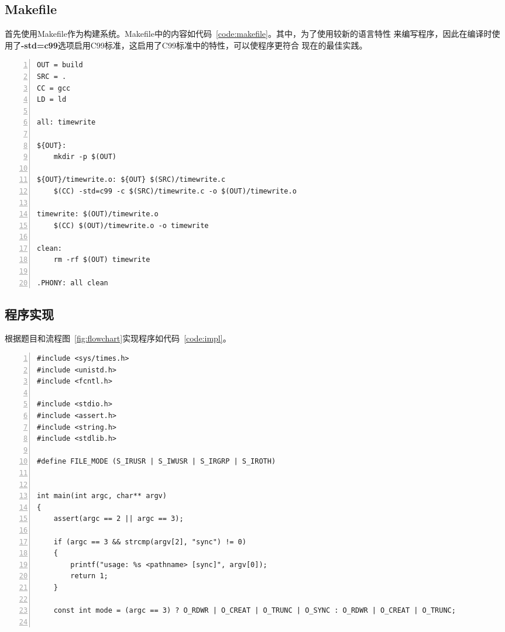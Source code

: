 \documentclass[a4paper,twoside]{article}
\begin{document}
\begin{spacing}{1.2}
\begin{figure}[htbp]
\begin{tikzpicture}[node distance=1cm]
	\end{tikzpicture}
\end{figure}

\subsection{Makefile}

首先使用Makefile作为构建系统。Makefile中的内容如代码~\ref{code:makefile}。其中，为了使用较新的语言特性
来编写程序，因此在编译时使用了\textbf{-std=c99}选项启用C99标准，这启用了C99标准中的特性，可以使程序更符合
现在的最佳实践。

\begin{lstlisting}[numbers=left,style=MakefileStyle,caption=Makefile,label={code:makefile}]
OUT = build
SRC = .
CC = gcc
LD = ld

all: timewrite

${OUT}: 
	mkdir -p $(OUT)

${OUT}/timewrite.o: ${OUT} $(SRC)/timewrite.c
	$(CC) -std=c99 -c $(SRC)/timewrite.c -o $(OUT)/timewrite.o

timewrite: $(OUT)/timewrite.o
	$(CC) $(OUT)/timewrite.o -o timewrite

clean: 
	rm -rf $(OUT) timewrite

.PHONY: all clean	
\end{lstlisting}

\subsection{程序实现}

根据题目和流程图~\ref{fig:flowchart}实现程序如代码~\ref{code:impl}。

\begin{lstlisting}[numbers=left,style=CppStyle,caption=程序实现,label={code:impl}]
#include <sys/times.h>
#include <unistd.h>
#include <fcntl.h>

#include <stdio.h>
#include <assert.h>
#include <string.h>
#include <stdlib.h>

#define FILE_MODE (S_IRUSR | S_IWUSR | S_IRGRP | S_IROTH)


int main(int argc, char** argv)
{
    assert(argc == 2 || argc == 3);

    if (argc == 3 && strcmp(argv[2], "sync") != 0)
    {
        printf("usage: %s <pathname> [sync]", argv[0]);
        return 1;
    }

    const int mode = (argc == 3) ? O_RDWR | O_CREAT | O_TRUNC | O_SYNC : O_RDWR | O_CREAT | O_TRUNC;


\end{lstlisting}
\end{spacing}
\end{document}
